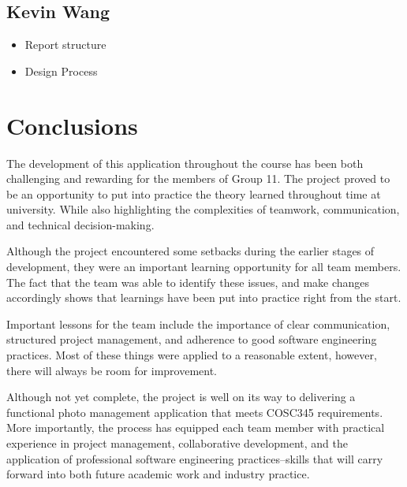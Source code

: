\documentclass[conference]{IEEEtran}
\begin{document}
\subsection{Kevin Wang}
\begin{itemize}
    \item Report structure
    \item Design Process
\end{itemize}

\section{Conclusions}
The development of this application throughout the course has been both challenging and rewarding for the members of Group 11. The project proved to be an opportunity to put into practice the theory learned throughout time at university. While also highlighting the complexities of teamwork, communication, and technical decision-making.

Although the project encountered some setbacks during the earlier stages of development, they were an important learning opportunity for all team members. The fact that the team was able to identify these issues, and make changes accordingly shows that learnings have been put into practice right from the start.

Important lessons for the team include the importance of clear communication, structured project management, and adherence to good software engineering practices. Most of these things were applied to a reasonable extent, however, there will always be room for improvement.

Although not yet complete, the project is well on its way to delivering a functional photo management application that meets COSC345 requirements. More importantly, the process has equipped each team member with practical experience in project management, collaborative development, and the application of professional software engineering practices–skills that will carry forward into both future academic work and industry practice.
\end{document}
